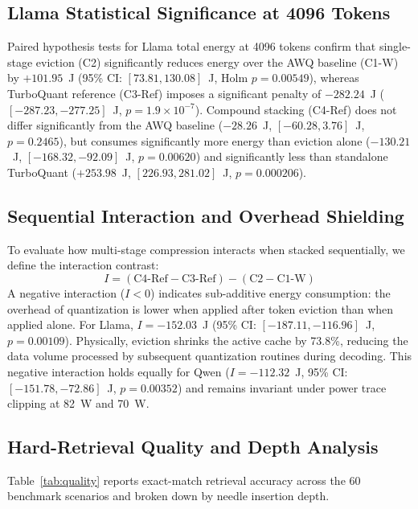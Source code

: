 \documentclass[sigconf,nonacm]{acmart}
\begin{document}
\subsection{Llama Statistical Significance at 4096 Tokens}
Paired hypothesis tests for Llama total energy at 4096 tokens confirm that single-stage eviction (C2) significantly reduces energy over the AWQ baseline (C1-W) by $+101.95$~J (95\% CI: $[73.81, 130.08]$~J, Holm $p = 0.00549$), whereas TurboQuant reference (C3-Ref) imposes a significant penalty of $-282.24$~J ($[-287.23, -277.25]$~J, $p = 1.9 \times 10^{-7}$). Compound stacking (C4-Ref) does not differ significantly from the AWQ baseline ($-28.26$~J, $[-60.28, 3.76]$~J, $p = 0.2465$), but consumes significantly more energy than eviction alone ($-130.21$~J, $[-168.32, -92.09]$~J, $p = 0.00620$) and significantly less than standalone TurboQuant ($+253.98$~J, $[226.93, 281.02]$~J, $p = 0.000206$).

\subsection{Sequential Interaction and Overhead Shielding}
\label{sec:interaction}

To evaluate how multi-stage compression interacts when stacked sequentially, we define the interaction contrast:
\begin{equation}
I = (\text{C4-Ref} - \text{C3-Ref}) - (\text{C2} - \text{C1-W})
\end{equation}
A negative interaction ($I < 0$) indicates sub-additive energy consumption: the overhead of quantization is lower when applied after token eviction than when applied alone. For Llama, $I = -152.03$~J (95\% CI: $[-187.11, -116.96]$~J, $p = 0.00109$). Physically, eviction shrinks the active cache by 73.8\%, reducing the data volume processed by subsequent quantization routines during decoding. This negative interaction holds equally for Qwen ($I = -112.32$~J, 95\% CI: $[-151.78, -72.86]$~J, $p = 0.00352$) and remains invariant under power trace clipping at 82~W and 70~W.

\subsection{Hard-Retrieval Quality and Depth Analysis}

Table~\ref{tab:quality} reports exact-match retrieval accuracy across the 60 benchmark scenarios and broken down by needle insertion depth.
\end{document}
